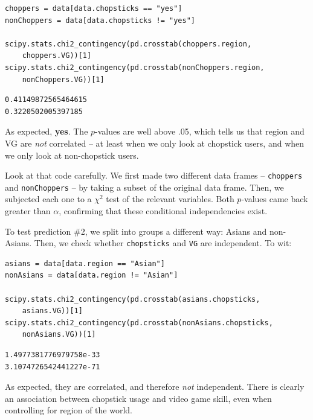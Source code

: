 \begin{Verbatim}[fontsize=\footnotesize,samepage=true,frame=single,framesep=3mm]
choppers = data[data.chopsticks == "yes"]
nonChoppers = data[data.chopsticks != "yes"]

scipy.stats.chi2_contingency(pd.crosstab(choppers.region,
    choppers.VG))[1]
scipy.stats.chi2_contingency(pd.crosstab(nonChoppers.region,
    nonChoppers.VG))[1]
\end{Verbatim}
\vspace{-.2in}

\begin{Verbatim}[fontsize=\small,samepage=true,frame=leftline,framesep=5mm,framerule=1mm]
0.41149872565464615
0.3220502005397185
\end{Verbatim}


As expected, \textbf{yes}. The $p$-values are well above .05, which tells us
that \textsf{region} and \textsf{VG} are \textit{not} correlated -- at least
when we only look at chopstick users, and when we only look at non-chopstick
users.

Look at that code carefully. We first made two different data frames --
\texttt{choppers} and \texttt{nonChoppers} -- by taking a subset of the
original data frame. Then, we subjected each one to a $\chi ^2$ test of the
relevant variables. Both $p$-values came back greater than $\alpha$, confirming
that these conditional independencies exist.

To test prediction \#2, we split into groups a different way: Asians and
non-Asians. Then, we check whether \texttt{chopsticks} and \texttt{VG} are
independent. To wit:

\begin{Verbatim}[fontsize=\footnotesize,samepage=true,frame=single,framesep=3mm]
asians = data[data.region == "Asian"]
nonAsians = data[data.region != "Asian"]

scipy.stats.chi2_contingency(pd.crosstab(asians.chopsticks,
    asians.VG))[1]
scipy.stats.chi2_contingency(pd.crosstab(nonAsians.chopsticks,
    nonAsians.VG))[1]
\end{Verbatim}
\vspace{-.2in}

\begin{Verbatim}[fontsize=\small,samepage=true,frame=leftline,framesep=5mm,framerule=1mm]
1.4977381776979758e-33
3.1074726542441227e-71
\end{Verbatim}

As expected, they are correlated, and therefore \textit{not} independent. There
is clearly an association between chopstick usage and video game skill, even
when controlling for region of the world.

